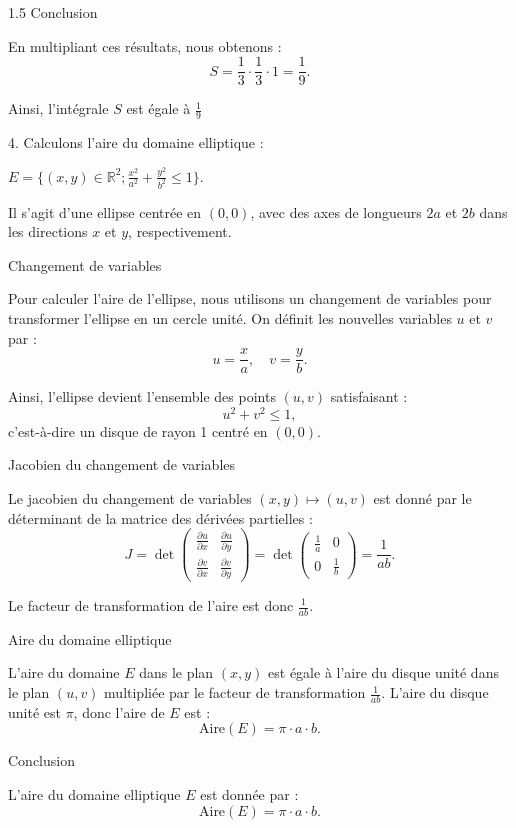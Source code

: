 \documentclass[12pt]{article}
\begin{document}
\begin{spacing}{1.5}
 Conclusion

En multipliant ces résultats, nous obtenons :
\[
S = \frac{1}{3} \cdot \frac{1}{3} \cdot 1 = \frac{1}{9}.
\]

Ainsi, l'intégrale \( S \) est égale à \( \frac{1}{9} \)


4. Calculons l'aire du domaine elliptique :

$E = \lbrace (x,y)\in \mathbb{R}^2;\frac{x^2}{a^2}+\frac{y^2}{b^2}\leq 1\rbrace$.

Il s'agit d'une ellipse centrée en \( (0, 0) \), avec des axes de longueurs \( 2a \) et \( 2b \) dans les directions \( x \) et \( y \), respectivement.

 Changement de variables

Pour calculer l'aire de l'ellipse, nous utilisons un changement de variables pour transformer l'ellipse en un cercle unité. On définit les nouvelles variables \( u \) et \( v \) par :
\[
u = \frac{x}{a}, \quad v = \frac{y}{b}.
\]

Ainsi, l'ellipse devient l'ensemble des points \( (u, v) \) satisfaisant :
\[
u^2 + v^2 \leq 1,
\]
c'est-à-dire un disque de rayon 1 centré en \( (0, 0) \).

Jacobien du changement de variables

Le jacobien du changement de variables \( (x, y) \mapsto (u, v) \) est donné par le déterminant de la matrice des dérivées partielles :
\[
J = \det \begin{pmatrix} \frac{\partial u}{\partial x} & \frac{\partial u}{\partial y} \\ \frac{\partial v}{\partial x} & \frac{\partial v}{\partial y} \end{pmatrix}
= \det \begin{pmatrix} \frac{1}{a} & 0 \\ 0 & \frac{1}{b} \end{pmatrix}
= \frac{1}{ab}.
\]

Le facteur de transformation de l'aire est donc \( \frac{1}{ab} \).

 Aire du domaine elliptique

L'aire du domaine \( E \) dans le plan \( (x, y) \) est égale à l'aire du disque unité dans le plan \( (u, v) \) multipliée par le facteur de transformation \( \frac{1}{ab} \). L'aire du disque unité est \( \pi \), donc l'aire de \( E \) est :
\[
\text{Aire}(E) = \pi \cdot a \cdot b.
\]

Conclusion

L'aire du domaine elliptique \( E \) est donnée par :
\[
\text{Aire}(E) = \pi \cdot a \cdot b.
\]






\end{spacing}
\end{document}
